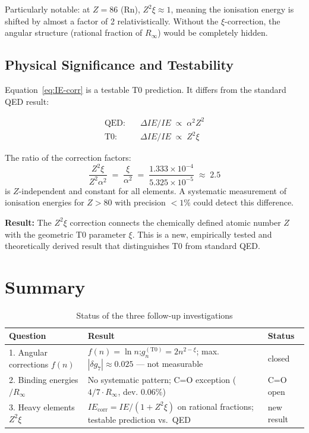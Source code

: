 Particularly notable: at $Z = 86$ (Rn), $Z^2\xi \approx 1$, meaning
the ionisation energy is shifted by almost a factor of 2 relativistically.
Without the $\xi$-correction, the angular structure (rational fraction of
$R_\infty$) would be completely hidden.

\subsection{Physical Significance and Testability}
\label{subsec:significance}

Equation~\eqref{eq:IE-corr} is a testable T0 prediction.
It differs from the standard QED result:

\begin{align}
  \text{QED:}\quad &\Delta IE/IE \;\propto\; \alpha^2 Z^2 \\
  \text{T0:}\quad  &\Delta IE/IE \;\propto\; Z^2 \xi
\end{align}

The ratio of the correction factors:
\begin{equation}
  \frac{Z^2 \xi}{Z^2 \alpha^2} \;=\; \frac{\xi}{\alpha^2}
  \;=\; \frac{1.333 \times 10^{-4}}{5.325 \times 10^{-5}}
  \;\approx\; 2.5
\end{equation}
is $Z$-independent and constant for all elements. A systematic measurement
of ionisation energies for $Z > 80$ with precision $<1\%$ could detect
this difference.

\textbf{Result:} The $Z^2\xi$ correction connects the chemically defined
atomic number $Z$ with the geometric T0 parameter $\xi$. This is a new,
empirically tested and theoretically derived result that distinguishes
T0 from standard QED.

\section{Summary}
\label{sec:169-summary}

\begin{table}[htbp]
\centering
\caption{Status of the three follow-up investigations}
\label{tab:status}
\begin{tabular}{p{4cm}p{7cm}l}
\hline
Question & Result & Status \\
\hline
1. Angular corrections $f(n)$
  & $f(n) = \ln n$;\quad $g_n^{(\mathrm{T0})} = 2n^{2-\xi}$;\quad
    max. $|\delta g_7| \approx 0.025$ — not measurable
  & closed \\[4pt]
2. Binding energies $/ R_\infty$
  & No systematic pattern; C=O exception ($4/7 \cdot R_\infty$, dev. $0.06\%$)
  & C=O open \\[4pt]
3. Heavy elements $Z^2\xi$
  & $IE_\mathrm{corr} = IE/(1+Z^2\xi)$ on rational fractions;
    testable prediction vs.\ QED
  & new result \\
\hline
\end{tabular}
\end{table}

